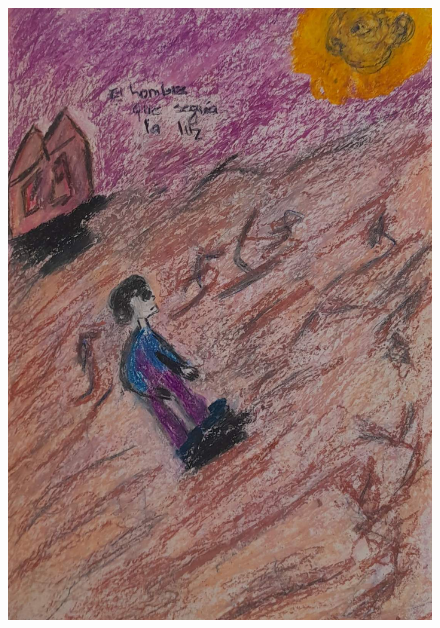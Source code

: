 \documentclass[12pt, a4paper, twoside]{book} %
\begin{document}
\begin{figure}[H]
	\centering
	\includegraphics[width=\textwidth]{./images/1f81324dd99091.jpg}
\end{figure}
\end{document}
